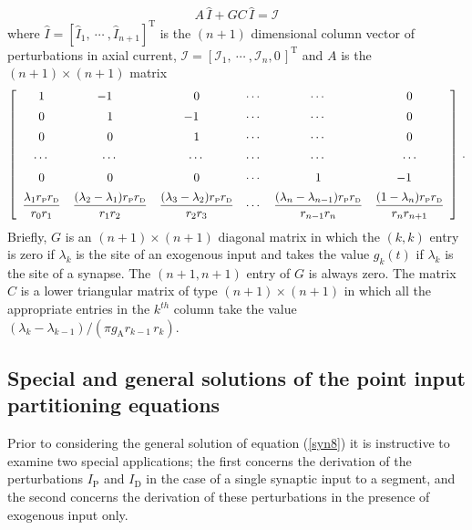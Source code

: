\begin{equation}\label{syn8}
A\,\widehat{I}+GC\,\widehat{I}=\mathcal{I}
\end{equation}
where $\widehat{I}=[\widehat{I}_1,\ \cdots\ ,\widehat{I}_{n+1}
]^\mathrm{T}$ is the $(n+1)$ dimensional column vector of
perturbations in axial current, $\mathcal{I}=[\mathcal{I}_1,\
\cdots\ , \mathcal{I}_n,0\,]^\mathrm{T}$ and $A$ is the
$(n+1)\times(n+1)$ matrix
\begin{equation}\label{syn9}
\left[\begin{array}{ccccccc}
1 & \hskip-9pt-1 &  0 & \cdots & \cdots & 0 \\[5pt]
0 &  1 & \hskip-9pt-1 & \cdots & \cdots & 0 \\[5pt]
0 &  0 &  1 & \cdots & \cdots & 0 \\[5pt]
\cdots & \cdots & \cdots & \cdots & \cdots & \cdots \\[5pt]
0 & 0 & 0 & \cdots & 1 & \hskip-9pt-1 \\[5pt]
\ds\frac{\lambda_1 r_\mathrm{P}r_\mathrm{D}}{r_0 r_1} &
\ds\frac{(\lambda_2-\lambda_1)r_\mathrm{P}r_\mathrm{D}}{r_1 r_2} &
\ds\frac{(\lambda_3-\lambda_2)r_\mathrm{P}r_\mathrm{D}}{r_2 r_3} &
\cdots & \ds\frac{(\lambda_n-\lambda_{n-1})r_\mathrm{P}r_\mathrm{D}}{r_{n-1} r_n} &
\ds\frac{(1-\lambda_n)r_\mathrm{P}r_\mathrm{D}}
{r_n r_{n+1}}
\end{array}\right]\,.
\end{equation}
Briefly, $G$ is an $(n+1)\times(n+1)$ diagonal matrix in which the
$(k,k)$ entry is zero if $\lambda_k$ is the site of an exogenous
input and takes the value $g_k(t)$ if $\lambda_k$ is the site of a
synapse. The $(n+1,n+1)$ entry of $G$ is always zero. The matrix
$C$ is a lower triangular matrix of type $(n+1)\times(n+1)$ in
which all the appropriate entries in the $k^{th}$ column take the
value $(\lambda_k-\lambda_{k-1})/(\pi g_\mathrm{A}r_{k-1}\,r_k)$.

\subsection{Special and general solutions of the point input partitioning equations}
Prior to considering the general solution of equation (\ref{syn8})
it is instructive to examine two special applications; the first
concerns the derivation of the perturbations $I_\mathrm{P}$ and
$I_\mathrm{D}$ in the case of a single synaptic input to a
segment, and the second concerns the derivation of these
perturbations in the presence of exogenous input only.


